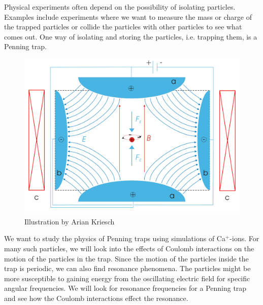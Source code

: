 Physical experiments often depend on the
possibility of isolating particles. Examples include experiments where we want to measure the mass or charge of the
trapped particles or collide the particles with
other particles to see what comes out. One way of isolating and
storing the particles, i.e. trapping them, is a Penning trap.

\begin{figure}
  \centering
  \includegraphics[scale=0.5]{figures/Penning_Trap.pdf}
  \caption{Illustration by Arian Kriesch}%
  \label{fig:penning}
\end{figure}

We want to study the physics of Penning traps using simulations of Ca$^+$-ions.
For many such particles, we will look into the effects of Coulomb interactions on the motion of the
particles in the trap.
Since the motion of the particles inside the trap is periodic, we can also find resonance
phenomena. The particles might be more susceptible to gaining energy
from the oscillating electric field for specific angular frequencies. We will look for
resonance frequencies for a Penning
trap and see how the Coulomb interactions effect the resonance.
